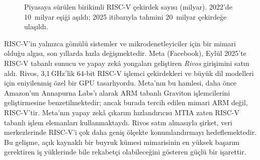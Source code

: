 \begin{figure}[H]
\centering
{}
\caption[RISC-V çekirdek sayısının yıllara göre büyümesi]{Piyasaya sürülen birikimli RISC-V çekirdek sayısı (milyar). 2022'de 10~milyar eşiği aşıldı; 2025 itibarıyla tahmini 20~milyar çekirdeğe ulaşıldı.}
\label{fig:riscv-buyume}
\end{figure}

\begin{bilginot}
RISC-V'in yalnızca gömülü sistemler ve mikrodenetleyiciler için bir mimari olduğu algısı, son yıllarda hızla değişmektedir. Meta (Facebook), Eylül 2025'te RISC-V tabanlı sunucu ve yapay zekâ yongaları geliştiren \emph{Rivos} girişimini satın aldı. Rivos, 3{,}1\,GHz'lik 64-bit RISC-V işlemci çekirdekleri ve büyük dil modelleri için eniyilenmiş özel bir GPU tasarlıyordu. Meta'nın bu hamlesi, daha önce Amazon'un Annapurna Labs'ı alarak ARM tabanlı Graviton işlemcilerini geliştirmesine benzetilmektedir; ancak burada tercih edilen mimari ARM değil, RISC-V'tir. Meta'nın yapay zekâ çıkarım hızlandırıcısı MTIA zaten RISC-V tabanlı işlem elemanları kullanmaktaydı. Rivos satın almasıyla şirket, veri merkezlerinde RISC-V'i çok daha geniş ölçekte konumlandırmayı hedeflemektedir. Bu gelişme, açık kaynaklı bir buyruk kümesi mimarisinin en yüksek başarım gerektiren iş yüklerinde bile rekabetçi olabileceğini gösteren güçlü bir işarettir.
\end{bilginot}

